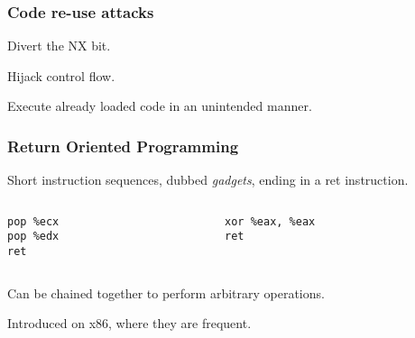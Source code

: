 \begin{frame}
	\frametitle{Code re-use attacks}

	Divert the NX bit.

	\vspace{0.5cm}

	Hijack control flow.

	\vspace{0.5cm}

	Execute already loaded code in an unintended manner.

\end{frame}

\begin{frame}[fragile]
	\frametitle{Return Oriented Programming}

	Short instruction sequences, dubbed \textit{gadgets}, ending in a ret instruction.

	\begin{columns}
		\begin{column}{0.5\textwidth}
			\begin{lstlisting}[frame=single,language={[x86masm]Assembler}]
pop %ecx
pop %edx
ret
			\end{lstlisting}
		\end{column}

		\begin{column}{0.5\textwidth}
			\begin{lstlisting}[frame=single,language={[x86masm]Assembler}]
xor %eax, %eax
ret
			\end{lstlisting}
		\end{column}
	\end{columns}

	\vspace{0.5cm}

	Can be chained together to perform arbitrary operations.

	\vspace{0.5cm}

	Introduced on x86, where they are frequent.

\end{frame}

